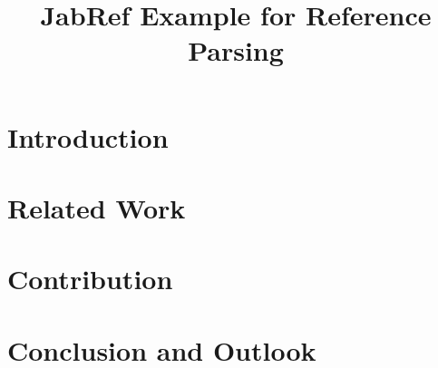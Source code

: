 \documentclass[conference,a4paper,english]{IEEEtran}[2015/08/26]
\begin{document}
\title{JabRef Example for Reference Parsing}
\author{%
}

\maketitle

\begin{abstract}
\lipsum[1]
\end{abstract}

\section{Introduction}
\lipsum[2]

\section{Related Work}
\lipsum[3]
\cite{Alver2007,Alver2007a,Kopp2012,Kopp2018,Koenig2023}

\section{Contribution}
\lipsum[4-6]

\section{Conclusion and Outlook}
\lipsum[7]

\atColsEnd{\vfil}



\end{document}
